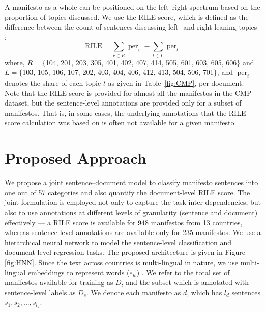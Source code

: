 \documentclass[11pt,a4paper]{article}
\DeclareMathOperator{\per}{per}
\newcommand{\tabref}[2][]{Table#1~\ref{#2}\xspace}
\begin{document}
A manifesto as a whole can be positioned on the left--right spectrum based on the proportion of topics discussed. We use the RILE score, which is defined as the difference between the count of sentences discussing left- and right-leaning topics \cite{cat}:
\begin{equation}
\text{RILE} = \sum_{r \in R} \per_{r} - \sum_{l \in L} \per_{l}
\end{equation}
where, $R = \{$104, 201, 203, 305, 401, 402, 407, 414, 505, 601, 603, 605, 606$\}$ and $L = \{$103, 105, 106, 107, 202, 403, 404, 406, 412, 413, 504, 506, 701$\}$, and $\per_{t}$ denotes the share of each topic $t$ as given in \tabref{fig:CMP}, per document.  Note that the RILE score is provided for almost all the manifestos in the CMP dataset, but the sentence-level annotations are provided only for a subset of manifestos. That is, in some cases, the underlying annotations that the RILE score calculation was based on is often not available for a given manifesto.



\section{Proposed Approach}

We propose a joint sentence--document model to classify manifesto sentences into one out of 57 categories and also quantify the document-level RILE score. The joint formulation is employed not only to capture the task inter-dependencies, but also to use annotations at different levels of granularity (sentence and document) effectively --- a RILE score is available for 948 manifestos from 13 countries, whereas sentence-level annotations are available only for 235 manifestos. We use a hierarchical neural network to model the sentence-level classification and document-level regression tasks. The proposed architecture is given in Figure \ref{fig:HNN}. Since the text across countries is multi-lingual in nature, we use multi-lingual embeddings to represent words ($e_{w}$) \cite{ammar2016massively}. We refer to the total set of manifestos available for training as $D$, and the subset which is annotated with sentence-level labels as $D_{s}$. We denote each manifesto as $d$, which has $l_{d}$ sentences $s_{1}, s_{2}, ..., s_{l_{d}}$. 

\end{document}
